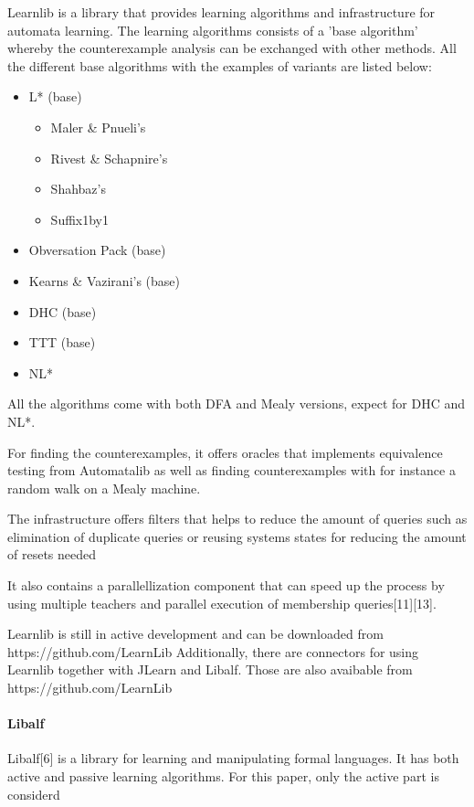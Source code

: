 \documentclass[multi,crop=false,class=article]{standalone}
\begin{document}
Learnlib is a library that provides learning algorithms and infrastructure for automata learning. 
The learning algorithms consists of a 'base algorithm' whereby the counterexample analysis can be exchanged with
other methods. All the different base algorithms with the examples of variants are listed below:

\begin{itemize}
	\item L* (base)
	\begin{itemize}
		\item Maler \& Pnueli's
		\item Rivest \& Schapnire's
		\item Shahbaz's
		\item Suffix1by1
	\end{itemize}
	\item Obversation Pack (base)
	\item Kearns \& Vazirani's (base)
	\item DHC (base)
	\item TTT (base)
	\item NL*
\end{itemize}

All the algorithms come with both DFA and Mealy versions, expect for DHC and NL*.

For finding the counterexamples, it offers oracles that implements equivalence testing from Automatalib as well as finding counterexamples with for instance a random walk on a Mealy machine.

The infrastructure offers filters that helps to reduce the amount of queries such as elimination of duplicate queries %
or reusing systems states for reducing the amount of resets needed 

It also contains a parallellization component that can speed up the process by using multiple teachers and parallel execution of membership queries[11][13]. 

Learnlib is still in active development and can be downloaded from https://github.com/LearnLib
Additionally, there are connectors for using Learnlib together with JLearn and Libalf. Those are also avaibable from https://github.com/LearnLib


\paragraph{Libalf}

Libalf[6] is a library for learning and manipulating formal languages. It has both active and passive learning algorithms.
For this paper, only the active part is considerd %
\end{document}
